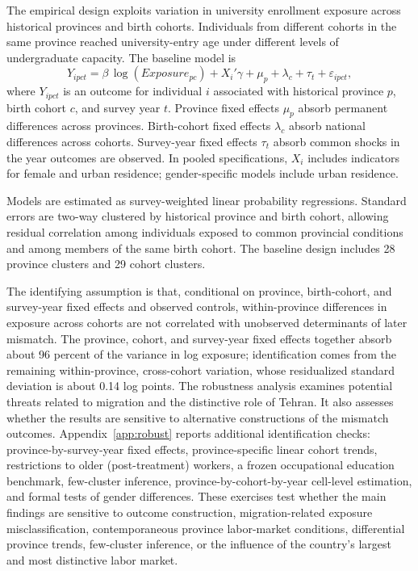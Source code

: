 The empirical design exploits variation in university enrollment exposure across historical provinces and birth cohorts. Individuals from different cohorts in the same province reached university-entry age under different levels of undergraduate capacity. The baseline model is
\begin{equation}
Y_{ipct} = \beta \, \log(Exposure_{pc}) + X_{i}'\gamma + \mu_{p} + \lambda_{c} + \tau_{t} + \varepsilon_{ipct},
\end{equation}
where $Y_{ipct}$ is an outcome for individual $i$ associated with historical province $p$, birth cohort $c$, and survey year $t$. Province fixed effects $\mu_{p}$ absorb permanent differences across provinces. Birth-cohort fixed effects $\lambda_{c}$ absorb national differences across cohorts. Survey-year fixed effects $\tau_{t}$ absorb common shocks in the year outcomes are observed. In pooled specifications, $X_{i}$ includes indicators for female and urban residence; gender-specific models include urban residence.

Models are estimated as survey-weighted linear probability regressions. Standard errors are two-way clustered by historical province and birth cohort, allowing residual correlation among individuals exposed to common provincial conditions and among members of the same birth cohort. The baseline design includes 28 province clusters and 29 cohort clusters.

The identifying assumption is that, conditional on province, birth-cohort, and survey-year fixed effects and observed controls, within-province differences in exposure across cohorts are not correlated with unobserved determinants of later mismatch. The province, cohort, and survey-year fixed effects together absorb about 96 percent of the variance in log exposure; identification comes from the remaining within-province, cross-cohort variation, whose residualized standard deviation is about 0.14 log points. The robustness analysis examines potential threats related to migration and the distinctive role of Tehran. It also assesses whether the results are sensitive to alternative constructions of the mismatch outcomes. Appendix~\ref{app:robust} reports additional identification checks: province-by-survey-year fixed effects, province-specific linear cohort trends, restrictions to older (post-treatment) workers, a frozen occupational education benchmark, few-cluster inference, province-by-cohort-by-year cell-level estimation, and formal tests of gender differences. These exercises test whether the main findings are sensitive to outcome construction, migration-related exposure misclassification, contemporaneous province labor-market conditions, differential province trends, few-cluster inference, or the influence of the country's largest and most distinctive labor market.

